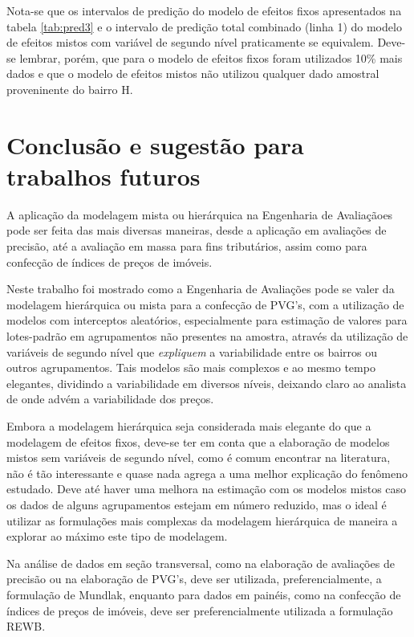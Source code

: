 \documentclass[
  a4paper, 12pt]{article}
\begin{document}
Nota-se que os intervalos de predição do modelo de efeitos fixos
apresentados na tabela \ref{tab:pred3} e o intervalo de predição total
combinado (linha 1) do modelo de efeitos mistos com variável de segundo
nível praticamente se equivalem. Deve-se lembrar, porém, que para o
modelo de efeitos fixos foram utilizados 10\% mais dados e que o modelo
de efeitos mistos não utilizou qualquer dado amostral proveninente do
bairro H.

\hypertarget{conclusuxe3o-e-sugestuxe3o-para-trabalhos-futuros}{%
\section{Conclusão e sugestão para trabalhos
futuros}\label{conclusuxe3o-e-sugestuxe3o-para-trabalhos-futuros}}

A aplicação da modelagem mista ou hierárquica na Engenharia de
Avaliaçãoes pode ser feita das mais diversas maneiras, desde a aplicação
em avaliações de precisão, até a avaliação em massa para fins
tributários, assim como para confecção de índices de preços de imóveis.

Neste trabalho foi mostrado como a Engenharia de Avaliações pode se
valer da modelagem hierárquica ou mista para a confecção de PVG's, com a
utilização de modelos com interceptos aleatórios, especialmente para
estimação de valores para lotes-padrão em agrupamentos não presentes na
amostra, através da utilização de variáveis de segundo nível que
\emph{expliquem} a variabilidade entre os bairros ou outros
agrupamentos. Tais modelos são mais complexos e ao mesmo tempo
elegantes, dividindo a variabilidade em diversos níveis, deixando claro
ao analista de onde advém a variabilidade dos preços.

Embora a modelagem hierárquica seja considerada mais elegante do que a
modelagem de efeitos fixos, deve-se ter em conta que a elaboração de
modelos mistos sem variáveis de segundo nível, como é comum encontrar na
literatura, não é tão interessante e quase nada agrega a uma melhor
explicação do fenômeno estudado. Deve até haver uma melhora na estimação
com os modelos mistos caso os dados de alguns agrupamentos estejam em
número reduzido, mas o ideal é utilizar as formulações mais complexas da
modelagem hierárquica de maneira a explorar ao máximo este tipo de
modelagem.

Na análise de dados em seção transversal, como na elaboração de
avaliações de precisão ou na elaboração de PVG's, deve ser utilizada,
preferencialmente, a formulação de Mundlak, enquanto para dados em
painéis, como na confecção de índices de preços de imóveis, deve ser
preferencialmente utilizada a formulação REWB.
\end{document}
